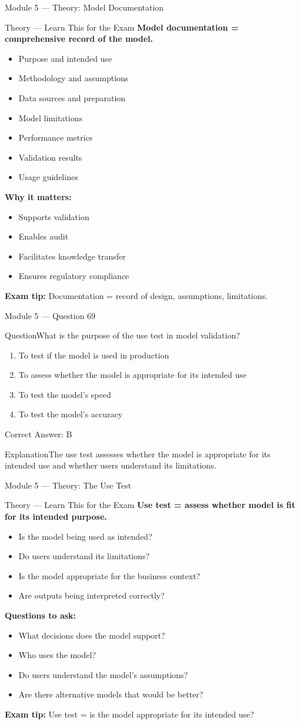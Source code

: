 \documentclass[aspectratio=169,10pt]{beamer}
\newcommand{\question}[1]{\begin{block}{Question}#1\end{block}}
\newcommand{\options}[4]{%
	\begin{enumerate}[label=\Alph*.,leftmargin=*]
		\item #1
		\item #2
		\item #3
		\item #4
	\end{enumerate}
}
\newcommand{\answerbox}[1]{\begin{exampleblock}{Correct Answer: #1}\end{exampleblock}}
\newcommand{\explain}[1]{\begin{block}{Explanation}#1\end{block}}
\newcommand{\theory}[1]{%
	\begin{block}{Theory --- Learn This for the Exam}
		\small #1
	\end{block}
}
\begin{document}
	\begin{frame}{Module 5 --- Theory: Model Documentation}
		\theory{
			\textbf{Model documentation = comprehensive record of the model.}
			\begin{itemize}
				\item Purpose and intended use
				\item Methodology and assumptions
				\item Data sources and preparation
				\item Model limitations
				\item Performance metrics
				\item Validation results
				\item Usage guidelines
			\end{itemize}
			\textbf{Why it matters:}
			\begin{itemize}
				\item Supports validation
				\item Enables audit
				\item Facilitates knowledge transfer
				\item Ensures regulatory compliance
			\end{itemize}
			\textbf{Exam tip:} Documentation = record of design, assumptions, limitations.
		}
	\end{frame}
	
	\begin{frame}{Module 5 --- Question 69}
		\question{What is the purpose of the use test in model validation?}
		\options{To test if the model is used in production}{To assess whether the model is appropriate for its intended use}{To test the model's speed}{To test the model's accuracy}
		\answerbox{B}
		\explain{The use test assesses whether the model is appropriate for its intended use and whether users understand its limitations.}
	\end{frame}
	
	\begin{frame}{Module 5 --- Theory: The Use Test}
		\theory{
			\textbf{Use test = assess whether model is fit for its intended purpose.}
			\begin{itemize}
				\item Is the model being used as intended?
				\item Do users understand its limitations?
				\item Is the model appropriate for the business context?
				\item Are outputs being interpreted correctly?
			\end{itemize}
			\textbf{Questions to ask:}
			\begin{itemize}
				\item What decisions does the model support?
				\item Who uses the model?
				\item Do users understand the model's assumptions?
				\item Are there alternative models that would be better?
			\end{itemize}
			\textbf{Exam tip:} Use test = is the model appropriate for its intended use?
		}
	\end{frame}
	
\end{document}
